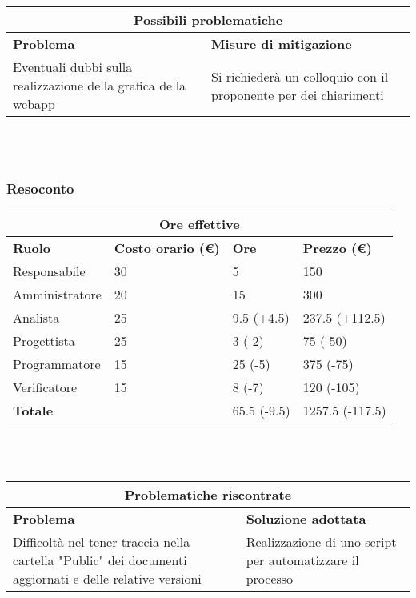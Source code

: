 \documentclass[a4paper, 12pt]{article}
\begin{document}
\begin{center}
    \begin{tabularx}{\textwidth}{|X|X|}
        \hline
        \multicolumn{2}{|c|}{\textbf{Possibili problematiche}}\\
        \hline
        \hline
        \textbf{Problema} & \textbf{Misure di mitigazione}\\
        \hline
        Eventuali dubbi sulla realizzazione della grafica della webapp & Si richiederà un colloquio con il proponente per dei chiarimenti\\
        \hline
    \end{tabularx}\\[8pt]
    \mbox{}\\
\end{center}
\subsubsection{Resoconto}\mbox{}

\begin{center}
    \begin{tabularx}{\textwidth}{|X|X|X|X|}
        \hline
        \multicolumn{4}{|c|}{\textbf{Ore effettive}}\\
        \hline
        \hline
        \textbf{Ruolo} & \textbf{Costo orario (\euro)} & \textbf{Ore} & \textbf{Prezzo (\euro)}\\
        \hline
        Responsabile    & 30 & 5  & 150\\
        \hline
        Amministratore  & 20 & 15  & 300\\
        \hline
        Analista        & 25 & 9.5 (+4.5)  & 237.5 (+112.5)\\
        \hline
        Progettista     & 25 & 3 (-2) & 75 (-50)\\
        \hline
        Programmatore   & 15 & 25 (-5)  & 375 (-75)\\
        \hline
        Verificatore    & 15 & 8 (-7)  & 120 (-105)\\
        \hline
        \hline
        \textbf{Totale} &    & 65.5 (-9.5) & 1257.5 (-117.5)\\
        \hline
    \end{tabularx}\\[8pt]
    \mbox{}\\
\end{center}

\begin{center}
    \begin{tabularx}{\textwidth}{|X|X|}
        \hline
        \multicolumn{2}{|c|}{\textbf{Problematiche riscontrate}}\\
        \hline
        \hline
        \textbf{Problema} & \textbf{Soluzione adottata}\\
        \hline
        Difficoltà nel tener traccia nella cartella "Public" dei documenti aggiornati e delle relative versioni & Realizzazione di uno script per automatizzare il processo\\
        \hline
    \end{tabularx}\\[8pt]
    \mbox{}\\
\end{center}
\end{document}
